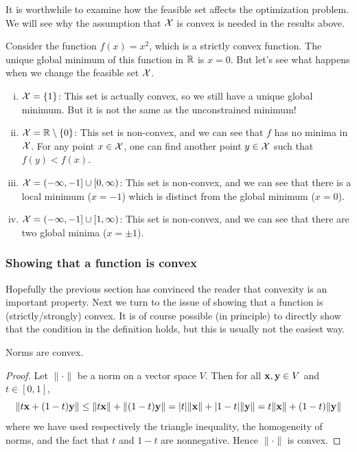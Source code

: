 It is worthwhile to examine how the feasible set affects the optimization problem.
We will see why the assumption that $\mathcal{X}$ is convex is needed in the results above.

Consider the function $f(x) = x^2$, which is a strictly convex function.
The unique global minimum of this function in $\mathbb{R}$ is $x = 0$.
But let's see what happens when we change the feasible set $\mathcal{X}$.
\begin{enumerate}[(i)]
\item $\mathcal{X} = \{1\}$: This set is actually convex, so we still have a unique global minimum.
But it is not the same as the unconstrained minimum!

\item $\mathcal{X} = \mathbb{R} \setminus \{0\}$: This set is non-convex, and we can see that $f$ has no minima in $\mathcal{X}$.
For any point $x \in \mathcal{X}$, one can find another point $y \in \mathcal{X}$ such that $f(y) < f(x)$.

\item $\mathcal{X} = (-\infty,-1] \cup [0,\infty)$: This set is non-convex, and we can see that there is a local minimum ($x = -1$) which is distinct from the global minimum ($x = 0$).

\item $\mathcal{X} = (-\infty,-1] \cup [1,\infty)$: This set is non-convex, and we can see that there are two global minima ($x = \pm 1$).
\end{enumerate}

\subsubsection{Showing that a function is convex}
Hopefully the previous section has convinced the reader that convexity is an important property.
Next we turn to the issue of showing that a function is (strictly/strongly) convex.
It is of course possible (in principle) to directly show that the condition in the definition holds, but this is usually not the easiest way.

\begin{proposition}
Norms are convex.
\end{proposition}
\begin{proof}
Let $\|\cdot\|$ be a norm on a vector space $V$. Then for all $\mathbf{x}, \mathbf{y} \in V$ and $t \in [0,1]$,
\[\|t\mathbf{x} + (1-t)\mathbf{y}\| \leq \|t\mathbf{x}\| + \|(1-t)\mathbf{y}\| = |t|\|\mathbf{x}\| + |1-t|\|\mathbf{y}\| = t\|\mathbf{x}\| + (1-t)\|\mathbf{y}\|\]
where we have used respectively the triangle inequality, the homogeneity of norms, and the fact that $t$ and $1-t$ are nonnegative.
Hence $\|\cdot\|$ is convex.
\end{proof}

